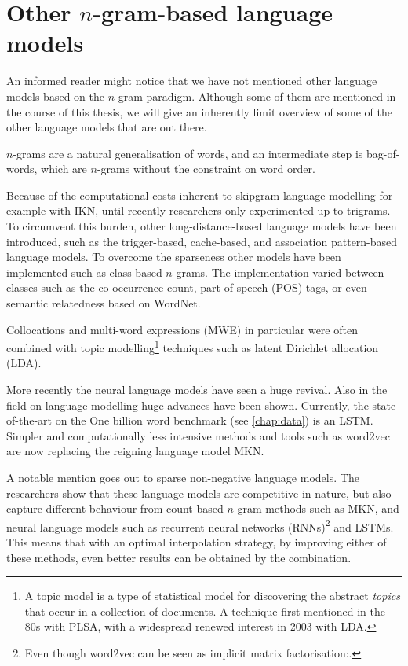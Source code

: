 \section{Other $n$-gram-based language models}
An informed reader might notice that we have not mentioned other language models based on the $n$-gram paradigm. Although some of them are mentioned in the course of this thesis, we will give an inherently limit overview of some of the other language models that are out there. 

$n$-grams are a natural generalisation of words, and an intermediate step is bag-of-words, which are $n$-grams without the constraint on word order. 

Because of the computational costs inherent to skipgram language modelling for example with IKN, until recently researchers only experimented up to trigrams. To circumvent this burden, other long-distance-based language models have been introduced, such as the trigger-based\cite{lau1993trigger}, cache-based\cite{clarkson1997language}, and association pattern-based\cite{chien2006association} language models. To overcome the sparseness other models have been implemented such as class-based $n$-grams\cite{brown1992class}. The implementation varied between classes such as the co-occurrence count, part-of-speech (POS) tags, or even semantic relatedness based on WordNet.

Collocations\cite{tomokiyo2003language} and multi-word expressions (MWE)\cite{blei2009visualizing} in particular were often combined with topic modelling\footnote{A topic model is a type of statistical model for discovering the abstract \emph{topics} that occur in a collection of documents. A technique first mentioned in the 80s with PLSA, with a widespread renewed interest in 2003 with LDA.} techniques such as latent Dirichlet allocation (LDA).

More recently the neural language models have seen a huge revival. Also in the field on language modelling huge advances have been shown. Currently, the state-of-the-art on the One billion word benchmark (see \cref{chap:data}) is an LSTM\cite{kuchaiev2017factorization}. Simpler and computationally less intensive methods and tools such as word2vec\cite{mikolov2013distributed} are now replacing the reigning language model MKN.

A notable mention goes out to sparse non-negative language models\cite{shazeer2015sparse}. The researchers show that these language models are competitive in nature, but also capture different behaviour from count-based $n$-gram methods such as MKN, and neural language models such as recurrent neural networks (RNNs)\footnote{Even though word2vec can be seen as implicit matrix factorisation:\cite{levy2015improving}.} and LSTMs. This means that with an optimal interpolation strategy, by improving either of these methods, even better results can be obtained by the combination.
